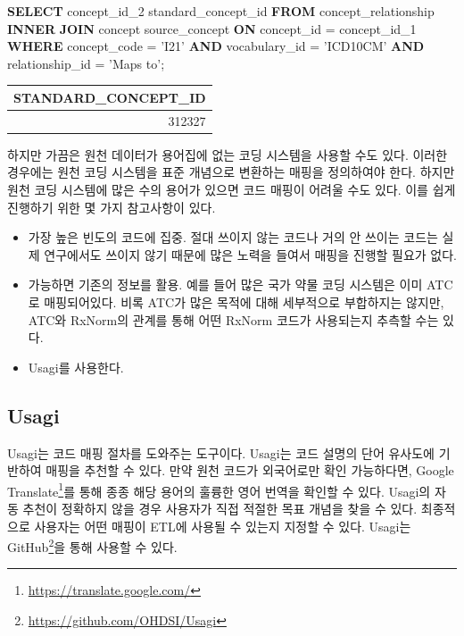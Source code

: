\documentclass[11pt]{book}
\newenvironment{Shaded}{\begin{snugshade}}{\end{snugshade}}
\newcommand{\KeywordTok}[1]{\textcolor[rgb]{0.13,0.29,0.53}{\textbf{#1}}}
\newcommand{\DecValTok}[1]{\textcolor[rgb]{0.00,0.00,0.81}{#1}}
\newcommand{\StringTok}[1]{\textcolor[rgb]{0.31,0.60,0.02}{#1}}
\newcommand{\NormalTok}[1]{#1}
\providecommand{\tightlist}{%
  \setlength{\itemsep}{0pt}\setlength{\parskip}{0pt}}
\let\rmarkdownfootnote\footnote%
\def\footnote{\protect\rmarkdownfootnote}
\theoremstyle{definition}
\theoremstyle{definition}
\theoremstyle{definition}
\theoremstyle{remark}
\begin{document}
\begin{Shaded}
\begin{Highlighting}[]
\KeywordTok{SELECT}\NormalTok{ concept_id_2 standard_concept_id}
\KeywordTok{FROM}\NormalTok{ concept_relationship}
\KeywordTok{INNER} \KeywordTok{JOIN}\NormalTok{ concept source_concept}
  \KeywordTok{ON}\NormalTok{ concept_id = concept_id_}\DecValTok{1}
\KeywordTok{WHERE}\NormalTok{ concept_code = }\StringTok{'I21'}
  \KeywordTok{AND}\NormalTok{ vocabulary_id = }\StringTok{'ICD10CM'}
  \KeywordTok{AND}\NormalTok{ relationship_id = }\StringTok{'Maps to'}\NormalTok{; }
\end{Highlighting}
\end{Shaded}

\begin{longtable}[]{@{}r@{}}
\toprule
STANDARD\_CONCEPT\_ID\tabularnewline
\midrule
\endhead
312327\tabularnewline
\bottomrule
\end{longtable}

하지만 가끔은 원천 데이터가 용어집에 없는 코딩 시스템을 사용할 수도
있다. 이러한 경우에는 원천 코딩 시스템을 표준 개념으로 변환하는 매핑을
정의하여야 한다. 하지만 원천 코딩 시스템에 많은 수의 용어가 있으면 코드
매핑이 어려울 수도 있다. 이를 쉽게 진행하기 위한 몇 가지 참고사항이
있다.

\begin{itemize}
\tightlist
\item
  가장 높은 빈도의 코드에 집중. 절대 쓰이지 않는 코드나 거의 안 쓰이는
  코드는 실제 연구에서도 쓰이지 않기 때문에 많은 노력을 들여서 매핑을
  진행할 필요가 없다.
\item
  가능하면 기존의 정보를 활용. 예를 들어 많은 국가 약물 코딩 시스템은
  이미 ATC로 매핑되어있다. 비록 ATC가 많은 목적에 대해 세부적으로
  부합하지는 않지만, ATC와 RxNorm의 관계를 통해 어떤 RxNorm 코드가
  사용되는지 추측할 수는 있다.
\item
  Usagi를 사용한다.
\end{itemize}

\subsection{Usagi}\label{usagi}

Usagi는 코드 매핑 절차를 도와주는 도구이다. Usagi는 코드 설명의 단어
유사도에 기반하여 매핑을 추천할 수 있다. 만약 원천 코드가 외국어로만
확인 가능하다면, Google Translate\footnote{\url{https://translate.google.com/}}를
통해 종종 해당 용어의 훌륭한 영어 번역을 확인할 수 있다. Usagi의 자동
추천이 정확하지 않을 경우 사용자가 직접 적절한 목표 개념을 찾을 수 있다.
최종적으로 사용자는 어떤 매핑이 ETL에 사용될 수 있는지 지정할 수 있다.
Usagi는 GitHub\footnote{\url{https://github.com/OHDSI/Usagi}}을 통해
사용할 수 있다.  
\end{document}

